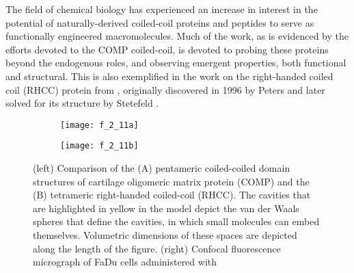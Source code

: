 \begin{refsection}
The field of chemical biology has experienced an increase in interest in the
potential of naturally-derived coiled-coil proteins and peptides to serve as
functionally engineered macromolecules. Much of the work, as is evidenced by the
efforts devoted to the COMP coiled-coil, is devoted to probing these proteins
beyond the endogenous roles, and observing emergent properties, both functional
and structural. This is also exemplified in the work on the right-handed coiled
coil (RHCC) protein from , originally discovered
in 1996 by Peters  and later solved for its structure by Stetefeld
.\cite{Peters1996,Stetefeld2000} 
\begin{figure}[h!]
    \centering
    \begin{subfigure}[b]{0.45\textwidth}
        \texttt{[image: f\_2\_11a]}
        \label{fig:coil_comparison}
    \end{subfigure}
    \begin{subfigure}[b]{0.45\textwidth}
        \texttt{[image: f\_2\_11b]}
        \label{fig:coil_localization}
    \end{subfigure}
    \caption[(left) Comparison of the (A) pentameric coiled-coiled domain
        structures of cartilage oligomeric matrix protein (COMP) and the
        (B) tetrameric right-handed coiled-coil (RHCC). The cavities that are
        highlighted in yellow in the model depict the van der Waals spheres that
        define the cavities, in which small molecules can embed themselves.
        Volumetric dimensions of these spaces are depicted along the length of
        the figure.
        (right) Confocal fluorescence micrograph of FaDu cells administered with
        RHCC, conjugated to Alexa Fluor 488 SDP, after incubation or 8 h at
        \SI{37}{\celsius}, collected by Eriksson. Blue channel assigned to
        DAPI-staining of nuclear DNA. Green channel assigned to dye-conjugated
        RHCC.]{(left) Comparison of the (A) pentameric coiled-coiled domain
        structures of cartilage oligomeric matrix protein (COMP) and the
        (B) tetrameric right-handed coiled-coil (RHCC). The cavities that are
        highlighted in yellow in the model depict the van der Waals spheres that
        define the cavities, in which small molecules can embed themselves.
        Volumetric dimensions of these spaces are depicted along the length of
        the figure.\cite{McFarlane2009}
        (right) Confocal fluorescence micrograph of FaDu cells administered with
}
\end{figure}
\end{refsection}
